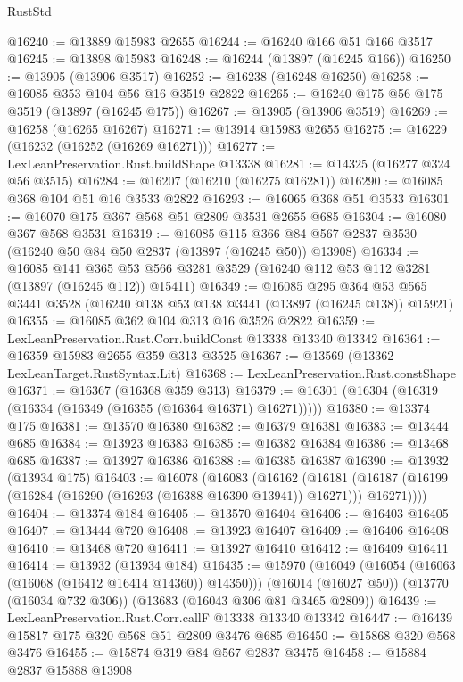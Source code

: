 \begin{lexlean}{RustStd}
\begin{coremodule}
@16240 := @13889 @15983 @2655
@16244 := @16240 @166 @51 @166 @3517
@16245 := @13898 @15983
@16248 := @16244 (@13897 (@16245 @166))
@16250 := @13905 (@13906 @3517)
@16252 := @16238 (@16248 @16250)
@16258 := @16085 @353 @104 @56 @16 @3519 @2822
@16265 := @16240 @175 @56 @175 @3519 (@13897 (@16245 @175))
@16267 := @13905 (@13906 @3519)
@16269 := @16258 (@16265 @16267)
@16271 := @13914 @15983 @2655
@16275 := @16229 (@16232 (@16252 (@16269 @16271)))
@16277 := LexLeanPreservation.Rust.buildShape @13338
@16281 := @14325 (@16277 @324 @56 @3515)
@16284 := @16207 (@16210 (@16275 @16281))
@16290 := @16085 @368 @104 @51 @16 @3533 @2822
@16293 := @16065 @368 @51 @3533
@16301 := @16070 @175 @367 @568 @51 @2809 @3531 @2655 @685
@16304 := @16080 @367 @568 @3531
@16319 := @16085
    @115
    @366
    @84
    @567
    @2837
    @3530
    (@16240 @50 @84 @50 @2837 (@13897 (@16245 @50)) @13908)
@16334 := @16085
    @141
    @365
    @53
    @566
    @3281
    @3529
    (@16240 @112 @53 @112 @3281 (@13897 (@16245 @112)) @15411)
@16349 := @16085
    @295
    @364
    @53
    @565
    @3441
    @3528
    (@16240 @138 @53 @138 @3441 (@13897 (@16245 @138)) @15921)
@16355 := @16085 @362 @104 @313 @16 @3526 @2822
@16359 := LexLeanPreservation.Rust.Corr.buildConst @13338 @13340 @13342
@16364 := @16359 @15983 @2655 @359 @313 @3525
@16367 := @13569 (@13362 LexLeanTarget.RustSyntax.Lit)
@16368 := LexLeanPreservation.Rust.constShape
@16371 := @16367 (@16368 @359 @313)
@16379 := @16301 (@16304 (@16319 (@16334 (@16349 (@16355 (@16364 @16371) @16271)))))
@16380 := @13374 @175
@16381 := @13570 @16380
@16382 := @16379 @16381
@16383 := @13444 @685
@16384 := @13923 @16383
@16385 := @16382 @16384
@16386 := @13468 @685
@16387 := @13927 @16386
@16388 := @16385 @16387
@16390 := @13932 (@13934 @175)
@16403 := @16078
    (@16083
      (@16162
        (@16181 (@16187 (@16199 (@16284 (@16290 (@16293 (@16388 @16390 @13941)) @16271))) @16271))))
@16404 := @13374 @184
@16405 := @13570 @16404
@16406 := @16403 @16405
@16407 := @13444 @720
@16408 := @13923 @16407
@16409 := @16406 @16408
@16410 := @13468 @720
@16411 := @13927 @16410
@16412 := @16409 @16411
@16414 := @13932 (@13934 @184)
@16435 := @15970
    (@16049 (@16054 (@16063 (@16068 (@16412 @16414 @14360)) @14350)))
    (@16014 (@16027 @50))
    (@13770 (@16034 @732 @306))
    (@13683 (@16043 @306 @81 @3465 @2809))
@16439 := LexLeanPreservation.Rust.Corr.callF @13338 @13340 @13342
@16447 := @16439 @15817 @175 @320 @568 @51 @2809 @3476 @685
@16450 := @15868 @320 @568 @3476
@16455 := @15874 @319 @84 @567 @2837 @3475
@16458 := @15884 @2837 @15888 @13908

\end{coremodule}
\end{lexlean}
